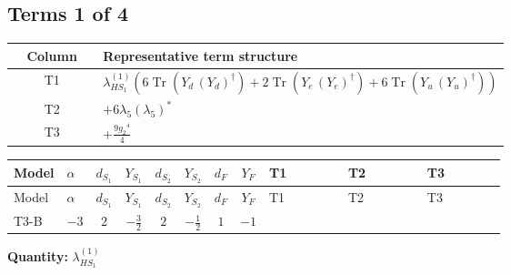 \documentclass[8pt]{article}
\begin{document}
\begin{landscape}
\subsection*{Terms 1 of 4}
\begin{center}
\begin{tabular}{@{}c >{\raggedright\arraybackslash}p{0.82\linewidth}@{}}
\toprule
Column & Representative term structure \\
\midrule
T1 & \(\displaystyle {\lambda_{HS_1}^{(1)}} (6 \operatorname{Tr}\!\left({Y_d}\,\left({Y_d}\right)^{\dagger}\right)+2 \operatorname{Tr}\!\left({Y_e}\,\left({Y_e}\right)^{\dagger}\right)+6 \operatorname{Tr}\!\left({Y_u}\,\left({Y_u}\right)^{\dagger}\right))\) \\
\midrule
T2 & \(\displaystyle +6 {\lambda_5} \left({\lambda_5}\right)^{*}\) \\
\midrule
T3 & \(\displaystyle +\frac{9 {g_2}^4}{4}\) \\
\midrule
\bottomrule
\end{tabular}
\end{center}
\smallskip
\tiny
\begin{longtable}{@{}llcccccc >{\raggedright\arraybackslash}p{0.21\linewidth} >{\raggedright\arraybackslash}p{0.21\linewidth} >{\raggedright\arraybackslash}p{0.21\linewidth}@{}}
\toprule
Model & $\alpha$ & $d_{S_1}$ & $Y_{S_1}$ & $d_{S_2}$ & $Y_{S_2}$ & $d_F$ & $Y_F$ & T1 & T2 & T3 \\
\midrule
\endfirsthead
\toprule
Model & $\alpha$ & $d_{S_1}$ & $Y_{S_1}$ & $d_{S_2}$ & $Y_{S_2}$ & $d_F$ & $Y_F$ & T1 & T2 & T3 \\
\midrule
\endhead
T3-B & $-3$ & $2$ & $-\frac{3}{2}$ & $2$ & $-\frac{1}{2}$ & $1$ & $-1$ & \scriptsize\adjustbox{max width=\linewidth}{$\begin{gathered} {\lambda_{HS_1}^{(1)}} (6 \operatorname{Tr}\!\left({Y_d}\,\left({Y_d}\right)^{\dagger}\right)+2 \operatorname{Tr}\!\left({Y_e}\,\left({Y_e}\right)^{\dagger}\right)+6 \operatorname{Tr}\!\left({Y_u}\,\left({Y_u}\right)^{\dagger}\right))\end{gathered}$} & \scriptsize\adjustbox{max width=\linewidth}{$\begin{gathered} +6 {\lambda_5} \left({\lambda_5}\right)^{*}\end{gathered}$} & \scriptsize\adjustbox{max width=\linewidth}{$\begin{gathered} +\frac{9 {g_2}^4}{4}\end{gathered}$} \\
\midrule
\bottomrule
\end{longtable}
\clearpage
\noindent\textbf{Quantity: }$\lambda_{HS_1}^{(1)}$\par\smallskip

\end{landscape}
\end{document}
